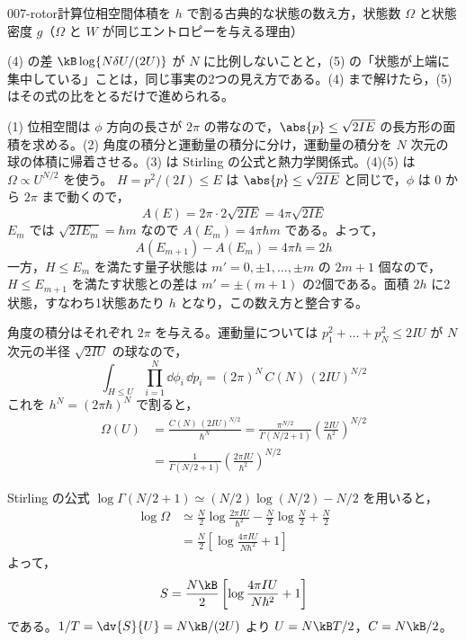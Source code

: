 \documentclass[uplatex,dvipdfmx,a4paper,11pt]{jsarticle}
\begin{document}
\begin{mondai}{007-rotor}{計算}{位相空間体積を $h$ で割る古典的な状態の数え方，状態数 $\Omega$ と状態密度 $g$（$\Omega$ と $W$ が同じエントロピーを与える理由）}
\begin{kizuki}
\item (4) の差 $\kB\log\{N\delta U/(2U)\}$ が $N$ に比例しないことと，(5) の「状態が上端に集中している」ことは，同じ事実の2つの見え方である。(4) まで解けたら，(5) はその式の比をとるだけで進められる。
\end{kizuki}
\begin{tadashii}
\houshin (1) 位相空間は $\phi$ 方向の長さが $2\pi$ の帯なので，$\abs{p}\le\sqrt{2IE}$ の長方形の面積を求める。(2) 角度の積分と運動量の積分に分け，運動量の積分を $N$ 次元の球の体積に帰着させる。(3) は Stirling の公式と熱力学関係式。(4)(5) は $\Omega\propto U^{N/2}$ を使う。
\keisan
{} $H=p^{2}/(2I)\le E$ は $\abs{p}\le\sqrt{2IE}$ と同じで，$\phi$ は $0$ から $2\pi$ まで動くので，
\[A(E)=2\pi\cdot2\sqrt{2IE}=4\pi\sqrt{2IE}\]
$E_{m}$ では $\sqrt{2IE_{m}}=\hbar m$ なので $A(E_{m})=4\pi\hbar m$ である。よって，
\[A(E_{m+1})-A(E_{m})=4\pi\hbar=2h\]
一方，$H\le E_{m}$ を満たす量子状態は $m'=0,\pm1,\dots,\pm m$ の $2m+1$ 個なので，$H\le E_{m+1}$ を満たす状態との差は $m'=\pm(m+1)$ の2個である。面積 $2h$ に2状態，すなわち1状態あたり $h$ となり，この数え方と整合する。

 角度の積分はそれぞれ $2\pi$ を与える。運動量については $p_{1}^{2}+\dots+p_{N}^{2}\le2IU$ が $N$ 次元の半径 $\sqrt{2IU}$ の球なので，
\[\int_{H\le U}\prod_{i=1}^{N}\dd\phi_{i}\,\dd p_{i}=(2\pi)^{N}\,C(N)\,(2IU)^{N/2}\]
これを $h^{N}=(2\pi\hbar)^{N}$ で割ると，
\begin{align*}
\Omega(U)&=\frac{C(N)\,(2IU)^{N/2}}{\hbar^{N}}=\frac{\pi^{N/2}}{\Gamma(N/2+1)}\left(\frac{2IU}{\hbar^{2}}\right)^{N/2}\\
&=\frac{1}{\Gamma(N/2+1)}\left(\frac{2\pi IU}{\hbar^{2}}\right)^{N/2}
\end{align*}

 Stirling の公式 $\log\Gamma(N/2+1)\simeq(N/2)\log(N/2)-N/2$ を用いると，
\begin{align*}
\log \Omega&\simeq\frac{N}{2}\log\frac{2\pi IU}{\hbar^{2}}-\frac{N}{2}\log\frac{N}{2}+\frac{N}{2}\\
&=\frac{N}{2}\left[\log\frac{4\pi IU}{N\hbar^{2}}+1\right]
\end{align*}
よって，
\[S=\frac{N\kB}{2}\left[\log\frac{4\pi IU}{N\hbar^{2}}+1\right]\]
である。$1/T=\dv{S}{U}=N\kB/(2U)$ より $U=N\kB T/2$，$C=N\kB/2$。


\end{tadashii}
\end{mondai}
\end{document}
